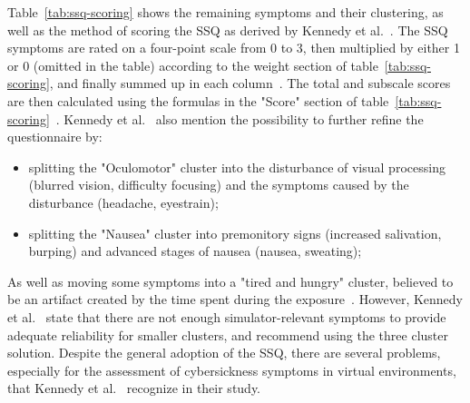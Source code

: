 Table~\ref{tab:ssq-scoring} shows the remaining symptoms and their clustering, as well as the method of scoring the
SSQ as derived by Kennedy et al.~\cite{Kennedy1993}.
The SSQ symptoms are rated on a four-point scale from 0 to 3, then multiplied by either 1 or 0 (omitted in the table)
according to the weight section of table~\ref{tab:ssq-scoring}, and finally summed up in each column~\cite{Kennedy1993}.
The total and subscale scores are then calculated using the formulas in the "Score" section of
table~\ref{tab:ssq-scoring}~\cite{Kennedy1993}.
Kennedy et al.~\cite{Kennedy1993} also mention the possibility to further refine the questionnaire by:
\begin{itemize}
    \item splitting the "Oculomotor" cluster into the disturbance of visual processing (blurred vision, difficulty
    focusing) and the symptoms caused by the disturbance (headache, eyestrain);
    \item splitting the "Nausea" cluster into premonitory signs (increased salivation, burping) and advanced stages
    of nausea (nausea, sweating);
\end{itemize}
As well as moving some symptoms into a "tired and hungry" cluster, believed to be an artifact created by the time
spent during the exposure~\cite{Kennedy1993}.
However, Kennedy et al.~\cite{Kennedy1993} state that there are not enough simulator-relevant symptoms to provide
adequate reliability for smaller clusters, and recommend using the three cluster solution.
Despite the general adoption of the SSQ, there are several problems, especially for the assessment of
cybersickness symptoms in virtual environments, that Kennedy et al.~\cite{Kennedy1993} recognize in their study.
